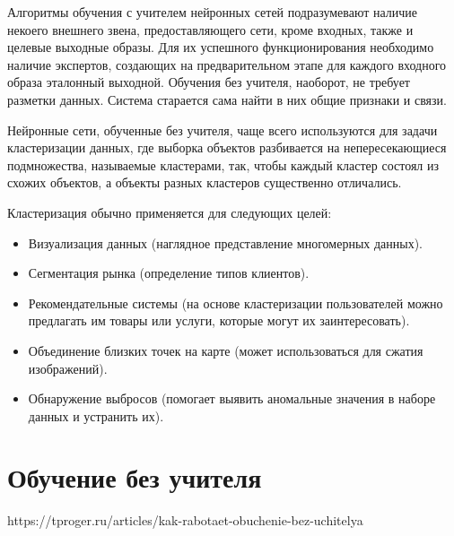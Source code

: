 \documentclass[bachelor, och, referat]{SCWorks}
\begin{document}




\tableofcontents

\intro 
Алгоритмы обучения с учителем нейронных сетей подразумевают наличие некоего внешнего звена, 
предоставляющего сети, кроме входных, также и целевые выходные образы. 
Для их успешного функционирования необходимо наличие экспертов, 
создающих на предварительном этапе для каждого входного образа эталонный выходной. 
Обучения без учителя, наоборот, не требует разметки данных. 
Система старается сама найти в них общие признаки и связи.

Нейронные сети, обученные без учителя, чаще всего используются
для задачи кластеризации данных, где выборка объектов разбивается на непересекающиеся подмножества, 
называемые кластерами, так, чтобы каждый кластер состоял из схожих объектов, 
а объекты разных кластеров существенно отличались. 

Кластеризация обычно применяется для следующих целей:
\begin{itemize}
    \item Визуализация данных (наглядное представление многомерных данных).
    \item Сегментация рынка (определение типов клиентов).
    \item Рекомендательные системы (на основе кластеризации пользователей можно предлагать им товары или услуги, которые могут их заинтересовать).
    \item Объединение близких точек на карте (может использоваться для сжатия изображений).
    \item Обнаружение выбросов (помогает выявить аномальные значения в наборе данных и устранить их).
\end{itemize}

\section{Обучение без учителя}
https://tproger.ru/articles/kak-rabotaet-obuchenie-bez-uchitelya
\end{document}
